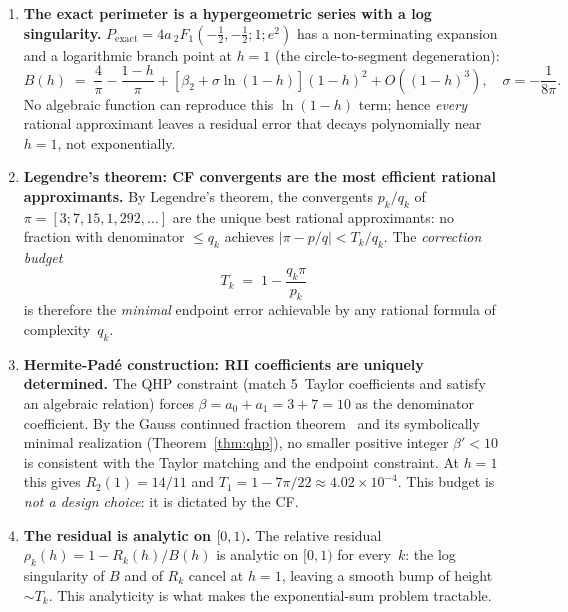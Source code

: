 \documentclass[12pt]{article}
\begin{document}
\begin{enumerate}

\item[\textbf{Step 1.}] \textbf{The exact perimeter is a hypergeometric series with a log singularity.}
$P_{\mathrm{exact}} = 4a\,{}_2F_1(-\tfrac12,-\tfrac12;1;e^2)$ has a non-terminating expansion
and a logarithmic branch point at $h = 1$ (the circle-to-segment degeneration):
\begin{equation}
B(h) \;=\; \frac{4}{\pi} - \frac{1-h}{\pi} + [\beta_2 + \sigma\ln(1-h)](1-h)^2 + O((1-h)^3),
\quad \sigma = -\frac{1}{8\pi}.
\end{equation}
No algebraic function can reproduce this $\ln(1-h)$ term; hence \emph{every} rational
approximant leaves a residual error that decays polynomially near $h=1$, not exponentially.

\item[\textbf{Step 2.}] \textbf{Legendre's theorem: CF convergents are the most efficient rational approximants.}
By Legendre's theorem, the convergents $p_k/q_k$ of $\pi = [3;7,15,1,292,\ldots]$ are the unique
best rational approximants: no fraction with denominator $\le q_k$ achieves $|\pi - p/q| < T_k/q_k$.
The \emph{correction budget}
\begin{equation}
T_k \;=\; 1 - \frac{q_k\pi}{p_k}
\end{equation}
is therefore the \emph{minimal} endpoint error achievable by any rational formula of complexity~$q_k$.

\item[\textbf{Step 3.}] \textbf{Hermite-Pad\'e construction: RII coefficients are uniquely determined.}
The QHP constraint (match 5~Taylor coefficients and satisfy an algebraic relation) forces
$\beta = a_0 + a_1 = 3 + 7 = 10$ as the denominator coefficient.  By the Gauss continued fraction
theorem~\cite{wang2026} and its symbolically minimal realization (Theorem~\ref{thm:qhp}), no smaller
positive integer $\beta' < 10$ is consistent with the Taylor matching and the endpoint constraint.
At $h=1$ this gives $R_2(1) = 14/11$ and $T_1 = 1 - 7\pi/22 \approx 4.02\times10^{-4}$.
This budget is \emph{not a design choice}: it is dictated by the CF.

\item[\textbf{Step 4.}] \textbf{The residual is analytic on $[0,1)$.}
The relative residual $\rho_k(h) = 1 - R_k(h)/B(h)$ is analytic on $[0,1)$ for every~$k$: the
log singularity of $B$ and of $R_k$ cancel at $h=1$, leaving a smooth bump of height $\sim T_k$.
This analyticity is what makes the exponential-sum problem tractable.


\end{enumerate}
\end{document}
